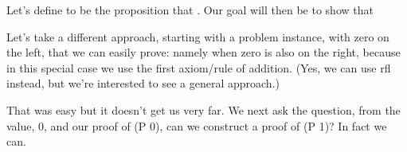 \documentclass[letterpaper,10pt,english]{sphinxmanual}
\begin{document}
\sphinxAtStartPar
Let’s define  to be the proposition that
. Our goal will then be to show that

\begin{sphinxVerbatim}[commandchars=\\\{\}]
            

       
\end{sphinxVerbatim}

\sphinxAtStartPar
Let’s take a different approach, starting with
a problem instance, with zero on the left, that
we can easily prove: namely when zero is also on
the right, because in this special case we 
use the first axiom/rule of addition. (Yes, we
can use rfl instead, but we’re interested to see
a general approach.)

\begin{sphinxVerbatim}[commandchars=\\\{\}]
     
          
\end{sphinxVerbatim}

\sphinxAtStartPar
That was easy but it doesn’t get us very far. We
next ask the question, from the value, 0, and our
proof of (P 0), can we construct a proof of (P 1)?
In fact we can.
\end{document}
